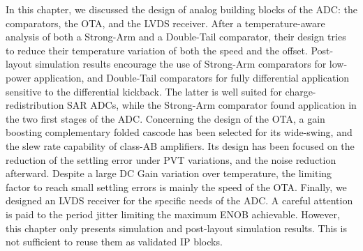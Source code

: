 In this chapter, we discussed the design of analog building blocks of the ADC\@: the comparators, the OTA, and the LVDS receiver. After a temperature-aware analysis of both a Strong-Arm and a Double-Tail comparator, their design tries to reduce their temperature variation of both the speed and the offset. Post-layout simulation results encourage the use of Strong-Arm comparators for low-power application, and Double-Tail comparators for fully differential application sensitive to the differential kickback. The latter is well suited for charge-redistribution SAR ADCs, while the Strong-Arm comparator found application in the two first stages of the ADC\@.
Concerning the design of the OTA, a gain boosting complementary folded cascode has been selected for its wide-swing, and the slew rate capability of class-AB amplifiers. Its design has been focused on the reduction of the settling error under PVT variations, and the noise reduction afterward. Despite a large DC Gain variation over temperature, the limiting factor to reach small settling errors is mainly the speed of the OTA\@.
Finally, we designed an LVDS receiver for the specific needs of the ADC\@. A careful attention is paid to the period jitter limiting the maximum ENOB achievable.
However, this chapter only presents simulation and post-layout simulation results. This is not sufficient to reuse them as validated IP blocks. 
